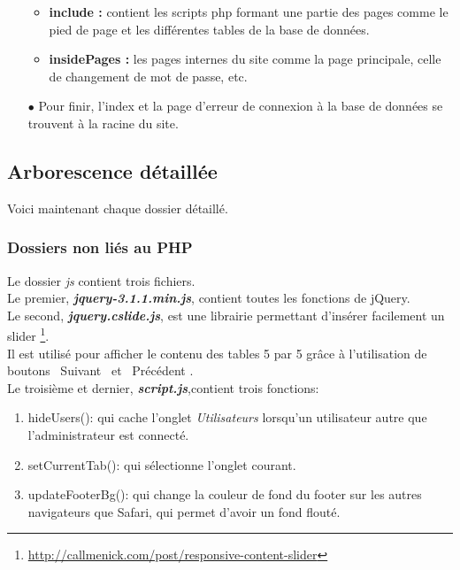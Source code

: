 \begin{itemize}
\begin{itemize}
         \item \textbf{include :} contient les scripts php formant une partie des pages comme le pied de page et les différentes tables de la base de données.
         
         \item \textbf{insidePages :} les pages internes du site comme la page principale, celle de changement de mot de passe, etc.
         
    \end{itemize}
    
    \item[$\bullet$] Pour finir, l’index et la page d’erreur de connexion à la base de données se trouvent à la racine du site.

\end{itemize}

\newpage


\subsection{Arborescence détaillée}
\label{sec:arb-details}

Voici maintenant chaque dossier détaillé.


\subsubsection{Dossiers non liés au PHP}
\label{sec:folder-no-php}

Le dossier \textit{js} contient trois fichiers.\\

Le premier, \textbf{\textit{jquery-3.1.1.min.js}}, contient toutes les fonctions de jQuery.\\

Le second, \textbf{\textit{jquery.cslide.js}}, est une librairie permettant d’insérer facilement un slider \footnote{\url{http://callmenick.com/post/responsive-content-slider}}.\\
Il est utilisé pour afficher le contenu des tables 5 par 5 grâce à l’utilisation de boutons \guillemotleft \ Suivant \guillemotright \ et \guillemotleft \ Précédent \guillemotright.\\

Le troisième et dernier, \textbf{\textit{script.js}},contient trois fonctions:
\begin{enumerate}

    \item hideUsers(): qui cache l'onglet \textit{Utilisateurs} lorsqu'un utilisateur autre que l'administrateur est connecté.
    
    \item setCurrentTab(): qui sélectionne l'onglet courant.
    
    \item updateFooterBg(): qui change la couleur de fond du footer sur les autres navigateurs que Safari, qui permet d'avoir un fond flouté.
    
\end{enumerate}


